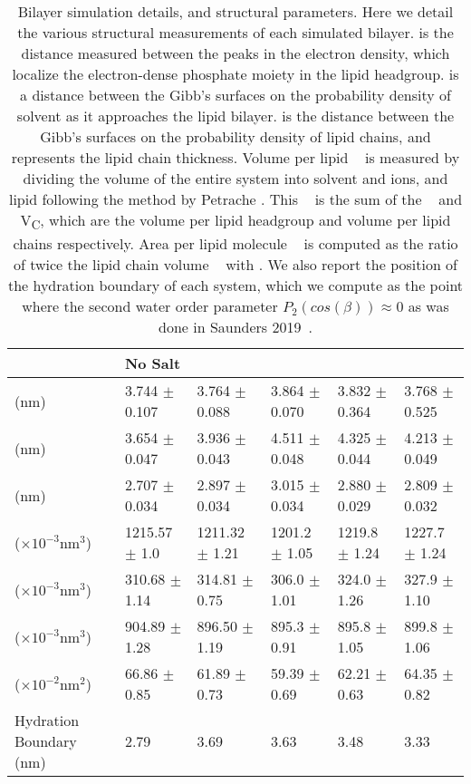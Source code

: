 \begin{table}
    \caption[Bilayer simulation details and structure]{Bilayer simulation details, and structural parameters. Here we detail the various
    structural measurements of each simulated bilayer.
    \dhh{} is the distance measured between the peaks in the electron density, which localize the electron-dense phosphate moiety in the lipid headgroup.
    \db{} is a distance between the Gibb's surfaces{\cite{fogarty:2015}} on the probability density of solvent as it approaches the lipid bilayer.
    \dc{} is the distance between the Gibb's surfaces on the probability density of lipid chains, and represents the lipid chain thickness.
    Volume per lipid \vl~ is measured by dividing the volume of the entire system into solvent and ions, and lipid following the method by Petrache \etal{}
    {\cite{petrache:1997}}.
    This \vl~ is the sum of the \vh~ and V\textsubscript{C}, which are the volume per lipid headgroup and volume per lipid chains respectively.
    Area per lipid molecule \al~ is computed as the ratio of twice the lipid chain volume \vc~ with \dc. We also report the
position of the hydration boundary of each system, which we compute as the point where the second water order parameter $P_2(cos(\beta))\approx 0$
{as was done in Saunders \etal{} 2019~\cite{saunders:2019}}.}
    \label{tabch3:struc}
    {\tiny
    \begin{tabularx}{\textwidth}{Y|Y|Y|Y|Y|Y}
            &No Salt&\na{} &\li{}&\mgmbnbfix{} &\mgmicro{} \\\hline
        \dhh{} (nm)    &3.744   $\pm$ 0.107  &3.764   $\pm$ 0.088 &3.864  $\pm$ 0.070&3.832  $\pm$ 0.364  &3.768  $\pm$ 0.525\\
        \db{}  (nm)    &3.654   $\pm$ 0.047  &3.936   $\pm$ 0.043 &4.511  $\pm$ 0.048&4.325  $\pm$ 0.044  &4.213  $\pm$ 0.049\\
        \dc{}  (nm)    &2.707   $\pm$ 0.034  &2.897   $\pm$ 0.034 &3.015  $\pm$ 0.034&2.880  $\pm$ 0.029  &2.809  $\pm$ 0.032\\
        \vl{}  ($\times 10^{-3}\text{nm}^3$)&1215.57 $\pm$ 1.0   &1211.32 $\pm$ 1.21 &1201.2 $\pm$ 1.05&1219.8 $\pm$ 1.24  &1227.7 $\pm$ 1.24\\
        \vh{}  ($\times 10^{-3}\text{nm}^3$)&310.68  $\pm$ 1.14  &314.81  $\pm$ 0.75 &306.0  $\pm$ 1.01&324.0  $\pm$ 1.26  &327.9  $\pm$ 1.10\\
        \vc{}  ($\times 10^{-3}\text{nm}^3$)&904.89  $\pm$ 1.28  &896.50  $\pm$ 1.19 &895.3  $\pm$ 0.91&895.8  $\pm$ 1.05  &899.8  $\pm$ 1.06\\
        \al{}  ($\times 10^{-2}\text{nm}^2$)&66.86   $\pm$ 0.85  &61.89   $\pm$ 0.73 &59.39  $\pm$ 0.69&62.21  $\pm$ 0.63  &64.35  $\pm$ 0.82\\
        Hydration Boundary (nm) & 2.79 &3.69&3.63 &3.48&3.33  \\
\end{tabularx}}
\end{table}

